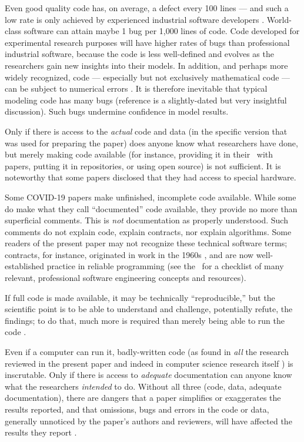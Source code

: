 \documentclass{comjnl}
\begin{document}
Even good quality code has, on average, a defect every 100 lines --- and {such a low} rate is only achieved by experienced industrial software developers \cite{ourReview}. World-class software can attain maybe 1 bug per 1,000 lines of code. Code developed for experimental research purposes will have higher rates of bugs than professional industrial software, because the code is less well-defined and evolves as the researchers gain new insights into their models. In addition, and perhaps more widely recognized, code --- especially but not exclusively mathematical code --- can be subject to numerical errors \cite{hamming}. It is therefore inevitable that typical modeling code has many bugs (reference \cite{NVP} is a slightly-dated but very insightful discussion). Such bugs undermine confidence in model results. 

Only if there is access to the \emph{actual\/} code and data (in the specific version that was used for preparing the paper) does anyone know what researchers have done, but merely making code available (for instance, providing it in their \supplement\ with papers, putting it in repositories, or using open source) is not sufficient. It is noteworthy that some papers disclosed that they had access to special hardware.

Some COVID-19 papers  make unfinished, incomplete code available. While some  do make what they call ``documented'' code available, they provide no more than superficial comments. This is \emph{not\/} documentation as properly understood. Such comments do not explain code, explain contracts, nor explain algorithms. Some readers of the present paper may not recognize these technical software terms; contracts, for instance, originated in work in the 1960s \cite{hoare}, and are now well-established practice in reliable programming {(see the \supplement\ for a checklist of many relevant, professional software engineering concepts and resources)}.

If full code is made available, it may be technically ``reproducible,'' but the scientific point is to be able to understand and challenge, potentially refute, the findings; to do that, much more is required than merely being able to run the code \cite{notebooks,popper}.

Even if a computer can run it, badly-written code (as found in \emph{all\/} the research reviewed in the present paper {and indeed in computer science research itself \cite{machine-learning-reproducibility}}) is inscrutable. Only if there is access to \emph{adequate\/} documentation can anyone know what the researchers \emph{intended\/} to do. Without all three (code, data, adequate documentation), there are dangers that a paper simplifies or exaggerates the results reported, and that omissions, bugs and errors in the code or data, generally unnoticed by the paper's authors and reviewers, will have affected the results they report \cite{relit}. 
\end{document}
